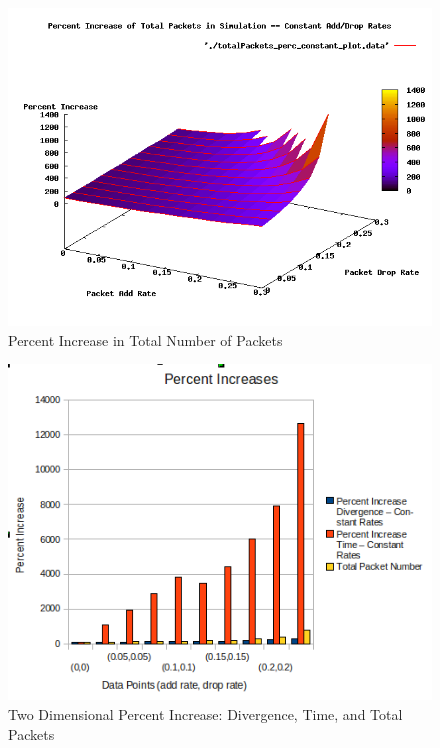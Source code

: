 \documentclass{article}
\begin{document}
\begin{figure}
	\centering
		\includegraphics[scale=0.5]{./plots/totalPackets_perc_constant_plot.png}
	\caption{Percent Increase in Total Number of Packets}
	\label{fig:countpercplot}
\end{figure}
\begin{figure}
	\centering
		\includegraphics[scale=0.65]{./plots/PercentIncreases_constant.png}
	\caption{Two Dimensional Percent Increase: Divergence, Time, and Total 
		Packets}
	\label{fig:bar1}
\end{figure}
\end{document}
